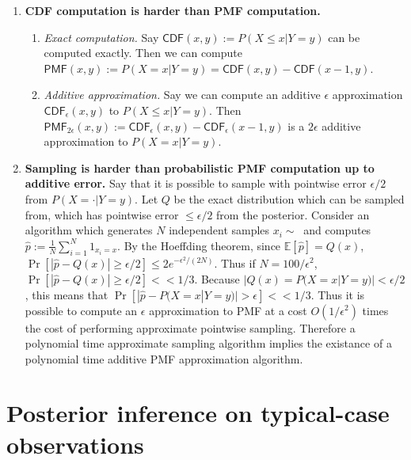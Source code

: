 \documentclass{article}
\theoremstyle{definition}
\theoremstyle{remark}
\begin{document}
\begin{enumerate}
    \item \textbf{CDF computation is harder than PMF computation.} 
        \begin{enumerate}
            \item \textit{Exact computation.} Say $\mathsf{CDF}(x, y) := P(X \leq x | Y = y)$ can be computed exactly.  Then we can compute $\mathsf{PMF}(x, y) := P(X = x | Y = y) = \mathsf{CDF}(x, y) - \mathsf{CDF}(x - 1, y)$.
            \item \textit{Additive approximation.} Say we can compute an additive $\epsilon$ approximation $\mathsf{CDF}_\epsilon(x, y)$ to $P(X \leq x | Y = y)$. Then $\mathsf{PMF}_{2\epsilon}(x, y) := \mathsf{CDF}_\epsilon(x, y) - \mathsf{CDF}_\epsilon(x-1, y)$ is a $2\epsilon$ additive approximation to $P(X = x | Y = y)$.
        \end{enumerate}
    \item \textbf{Sampling is harder than probabilistic PMF computation up to additive error.} Say that it is possible to sample with pointwise error $\epsilon / 2$ from $P(X = \cdot | Y = y)$. Let $Q$ be the exact distribution which can be sampled from, which has pointwise error $\leq \epsilon / 2$ from the posterior.  Consider an algorithm which generates $N$ independent samples $x_i \sim ~$ and computes $\hat{p} := \frac{1}{N} \sum_{i=1}^N 1_{x_i = x}$.
    By the Hoeffding theorem, since $\mathbb{E}[\hat{p}] = Q(x)$, $\Pr[|\hat{p} - Q(x)| \geq \epsilon / 2] \leq 2e^{-\epsilon^2/(2N)}$. Thus if $N = 100/\epsilon^2$, $\Pr[|\hat{p} - Q(x)| \geq \epsilon / 2] << 1/3$.
    Because $|Q(x) = P(X = x | Y = y)| < \epsilon/2$, this means that
    $\Pr[|\hat{p} - P(X = x | Y = y)| > \epsilon] << 1/3$.
    Thus it is possible to compute an $\epsilon$ approximation to PMF at a cost $O(1/\epsilon^2)$ times the cost of performing approximate pointwise sampling.
    Therefore a polynomial time approximate sampling algorithm implies the existance of a polynomial time additive PMF approximation algorithm.
\end{enumerate}

\section{Posterior inference on typical-case observations}
\end{document}
